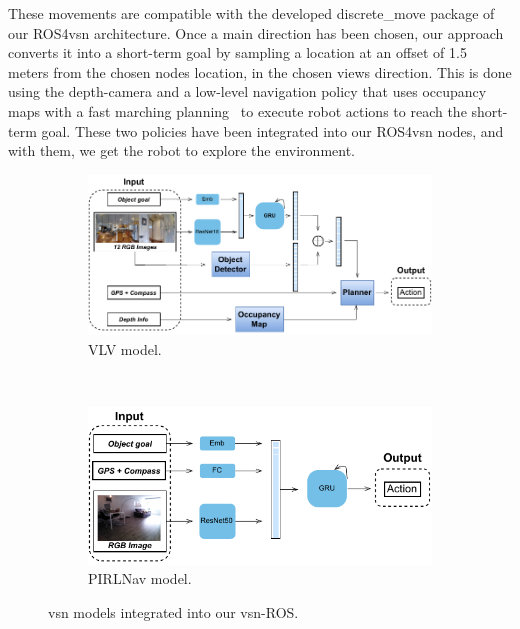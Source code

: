 These movements are compatible with the developed discrete\_move package of our ROS4\acrshort{vsn} architecture.
Once a main direction has been chosen, our approach converts it into a short-term goal by sampling a location at an offset of 1.5 meters from the chosen node\textquotesingle s location, in the chosen view\textquotesingle s direction.
This is done using the depth-camera and a low-level navigation policy that uses occupancy maps with a fast marching planning~\cite{Sethian1996} to execute robot actions to reach the short-term goal.
These two policies have been integrated into our ROS4\acrshort{vsn} nodes, and with them, we get the robot to explore the environment.

\begin{figure}
    \centering
    \begin{subfigure}[b]{\textwidth}
        \includegraphics[width=\textwidth]{figures/ros4vsn/vlv_diagram}
        \caption{VLV model.}
        \label{fig:vlv_overview}
    \end{subfigure}
    ~
    \begin{subfigure}[b]{\textwidth}
        \includegraphics[width=\textwidth]{figures/ros4vsn/pirlnav_diagram}
        \caption{PIRLNav model.}
        \label{fig:pirlnav_overview}
    \end{subfigure}
    \caption{\acrshort{vsn} models integrated into our \acrshort{vsn}-ROS.}\label{fig:vsn_models_overview}
\end{figure}

